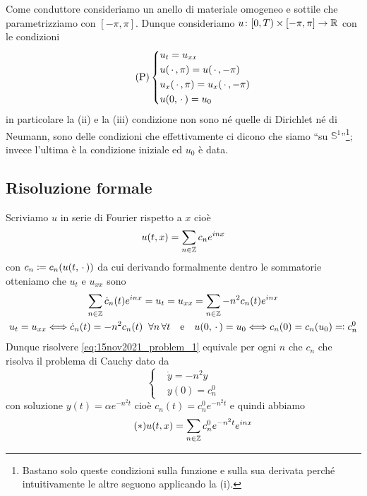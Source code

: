 Come conduttore consideriamo un anello di materiale omogeneo e sottile che parametrizziamo con $[-\pi, \pi]$. Dunque consideriamo $u \colon [0, T) \times [-\pi, \pi] \to \mathbb R$ con le condizioni
\begin{equation}
\tag{P} \label{eq:15nov2021_problem_1}
\left\{
\begin{aligned}
	& u_t = u_{xx} \\
	& u(\,\cdot\,, \pi) = u(\,\cdot\,, -\pi) \\
	& u_x(\,\cdot\,, \pi) = u_x(\,\cdot\,, -\pi) \\
	& u(0, \,\cdot\,) = u_0
\end{aligned}
\right.
\end{equation}
in particolare la (ii) e la (iii) condizione non sono né quelle di Dirichlet né di Neumann, sono delle condizioni che effettivamente ci dicono che siamo ``su $\mathbb S^1$''\footnote{Bastano solo queste condizioni sulla funzione e sulla sua derivata perché intuitivamente le altre seguono applicando la (i).}; invece l'ultima è la condizione iniziale ed $u_0$ è data.

\subsection{Risoluzione formale}

Scriviamo $u$ in serie di Fourier rispetto a $x$ cioè
$$
u(t, x) = \sum_{n \in \mathbb Z} c_n e^{inx}
$$
con $c_n \coloneqq c_n(u(t, \,\cdot\,))$ da cui derivando formalmente dentro le sommatorie otteniamo che $u_t$ e $u_{xx}$ sono
$$
\begin{gathered}
	\sum_{n \in \mathbb Z} \dot c_n(t) e^{inx} = u_t = u_{xx} = \sum_{n \in \mathbb Z} -n^2 c_n(t) e^{inx} \\
	u_t = u_{xx} \Longleftrightarrow  \dot c_n(t) = -n^2 c_n(t) \;\; \forall n \, \forall t
	\quad
	\text{e} 
	\quad
	u(0, \,\cdot\,) = u_0 \Longleftrightarrow c_n(0) = c_n(u_0) \eqqcolon c_n^0
\end{gathered}
$$
Dunque risolvere \eqref{eq:15nov2021_problem_1} equivale per ogni $n$ che $c_n$ che risolva il problema di Cauchy dato da
\begin{equation}
	\tag{P$'$} \label{eq:15nov2021_problem_2}
	\left\{
	\begin{aligned}
		& \dot y = -n^2 y \\
		& y(0) = c_n^0
	\end{aligned}
	\right.
\end{equation}
con soluzione $y(t) = \alpha e^{-n^2 t}$ cioè $c_n(t) = c_n^0 e^{-n^2 t}$ e quindi abbiamo
\begin{equation}
	\tag{$*$} \label{eq:15nov2021_solution}
	u(t, x) = \sum_{n \in \mathbb Z} c_n^0 e^{-n^2 t} e^{inx}
\end{equation}

